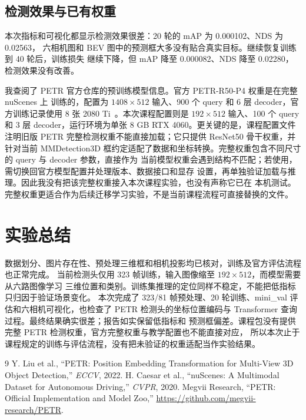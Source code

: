 \documentclass[UTF8,zihao=5,scheme=chinese]{ctexart}
\begin{document}
\subsection{检测效果与已有权重}

本次指标和可视化都显示检测效果很差：20 轮的 mAP 为 0.000102、NDS 为 0.02563，
六相机图和 BEV 图中的预测框大多没有贴合真实目标。继续恢复训练到 40 轮后，训练损失
继续下降，但 mAP 降至 0.000082、NDS 降至 0.02280，检测效果没有改善。

我查阅了 PETR 官方仓库的预训练模型信息。官方 PETR-R50-P4 权重是在完整 nuScenes 上
训练的，配置为 $1408\times512$ 输入、900 个 query 和 6 层 decoder，官方训练记录使用
8 张 2080 Ti~\cite{petr-code}。本次课程配置则是 $192\times512$ 输入、100 个 query 和
3 层 decoder，运行环境为单张 8 GB RTX 4060。更关键的是，课程配置文件注明旧版 PETR
完整检测权重不能直接加载；它只提供 ResNet50 骨干权重，并针对当前 MMDetection3D
框约定适配了数据和坐标转换。完整权重包含不同尺寸的 query 与 decoder 参数，直接作为
当前模型权重会遇到结构不匹配；若使用，需切换回官方模型配置并处理版本、数据接口和显存
设置，再单独验证加载与推理。因此我没有把该完整权重接入本次课程实验，也没有声称它已在
本机测试。完整权重更适合作为后续迁移学习实验，不是当前课程流程可直接替换的文件。

\section{实验总结}

数据划分、图片存在性、预处理三维框和相机投影均已核对，训练及官方评估流程也正常完成。
当前检测头仅用 323 帧训练，输入图像缩至 $192\times512$，而模型需要从六路图像学习
三维位置和类别。训练集推理的定位同样不稳定，不能把低指标只归因于验证场景变化。
本次完成了 323/81 帧预处理、20 轮训练、mini\_val 评估和六相机可视化，也检查了 PETR
检测头的坐标位置编码与 Transformer 查询过程。最终结果确实很差；报告如实保留低指标和
预测框偏差。课程包没有提供完整 PETR 检测权重，官方完整权重与教学配置也不能直接对应，
所以本次止于课程规定的训练与评估流程，没有把未验证的权重适配当作实验结果。

\begin{thebibliography}{9}
   Y. Liu et al., ``PETR: Position Embedding Transformation for
  Multi-View 3D Object Detection,'' \textit{ECCV}, 2022.
   H. Caesar et al., ``nuScenes: A Multimodal Dataset for
  Autonomous Driving,'' \textit{CVPR}, 2020.
   Megvii Research, ``PETR: Official Implementation and
  Model Zoo,'' \url{https://github.com/megvii-research/PETR}.
\end{thebibliography}
\end{document}
